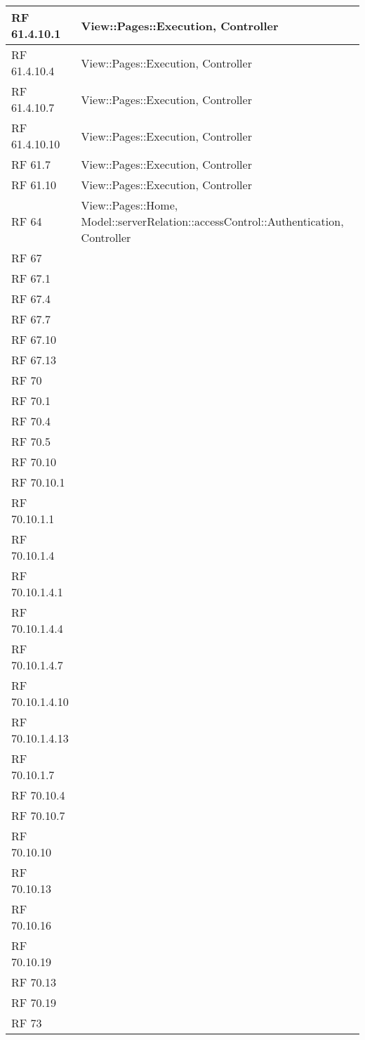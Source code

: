 {\begin{longtable} [c]{| p{2cm} | p{13cm} |}
 \hline 
RF 61.4.10.1 & View::\-Pages::\-Execution, Controller\\ 
 \hline 
RF 61.4.10.4 & View::\-Pages::\-Execution, Controller\\ 
 \hline 
RF 61.4.10.7 & View::\-Pages::\-Execution, Controller\\ 
 \hline 
RF 61.4.10.10 & View::\-Pages::\-Execution, Controller\\ 
 \hline 
RF 61.7 & View::\-Pages::\-Execution, Controller\\ 
 \hline 
RF 61.10 & View::\-Pages::\-Execution, Controller\\ 
 \hline 
RF 64 & View::\-Pages::\-Home, Model::\-serverRelation::\-accessControl::\-Authentication, Controller\\ 
 \hline 
RF 67 & \\ 
 \hline 
RF 67.1 & \\ 
 \hline 
RF 67.4 & \\ 
 \hline 
RF 67.7 & \\ 
 \hline 
RF 67.10 & \\ 
 \hline 
RF 67.13 & \\ 
 \hline 
RF 70 & \\ 
 \hline 
RF 70.1 & \\ 
 \hline 
RF 70.4 & \\ 
 \hline 
RF 70.5 & \\ 
 \hline 
RF 70.10 & \\ 
 \hline 
RF 70.10.1 & \\ 
 \hline 
RF 70.10.1.1 & \\ 
 \hline 
RF 70.10.1.4 & \\ 
 \hline 
RF 70.10.1.4.1 & \\ 
 \hline 
RF 70.10.1.4.4 & \\ 
 \hline 
RF 70.10.1.4.7 & \\ 
 \hline 
RF 70.10.1.4.10 & \\ 
 \hline 
RF 70.10.1.4.13 & \\ 
 \hline 
RF 70.10.1.7 & \\ 
 \hline 
RF 70.10.4 & \\ 
 \hline 
RF 70.10.7 & \\ 
 \hline 
RF 70.10.10 & \\ 
 \hline 
RF 70.10.13 & \\ 
 \hline 
RF 70.10.16 & \\ 
 \hline 
RF 70.10.19 & \\ 
 \hline 
RF 70.13 & \\ 
 \hline 
RF 70.19 & \\ 
 \hline 
RF 73 & \\ 
 \hline 
\end{longtable}}